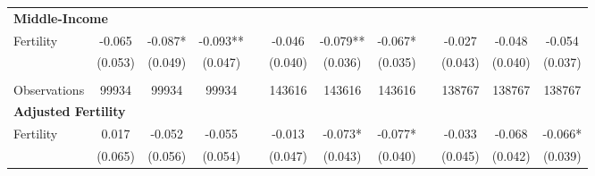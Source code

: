 \begin{table}[htpb!]
\begin{center}
{\begin{tabular}{lcccp{2mm}cccp{2mm}ccc}
\multicolumn{12}{l}{\textbf{Middle-Income}}\\ 
Fertility&-0.065&-0.087*&-0.093**&&-0.046&-0.079**&-0.067*&&-0.027&-0.048&-0.054\\
&(0.053)&(0.049)&(0.047)&&(0.040)&(0.036)&(0.035)&&(0.043)&(0.040)&(0.037)\\
\begin{footnotesize}\end{footnotesize}&\begin{footnotesize}\end{footnotesize}&\begin{footnotesize}\end{footnotesize}&\begin{footnotesize}\end{footnotesize}&\begin{footnotesize}\end{footnotesize}&\begin{footnotesize}\end{footnotesize}&\begin{footnotesize}\end{footnotesize}&\begin{footnotesize}\end{footnotesize}&\begin{footnotesize}\end{footnotesize}&\begin{footnotesize}\end{footnotesize}\\Observations&99934&99934&99934&&143616&143616&143616&&138767&138767&138767\\
\multicolumn{12}{l}{\textbf{Adjusted Fertility}}\\ 
Fertility&0.017&-0.052&-0.055&&-0.013&-0.073*&-0.077*&&-0.033&-0.068&-0.066*\\
&(0.065)&(0.056)&(0.054)&&(0.047)&(0.043)&(0.040)&&(0.045)&(0.042)&(0.039)\\

\end{tabular}}
\end{center}
\end{table}
